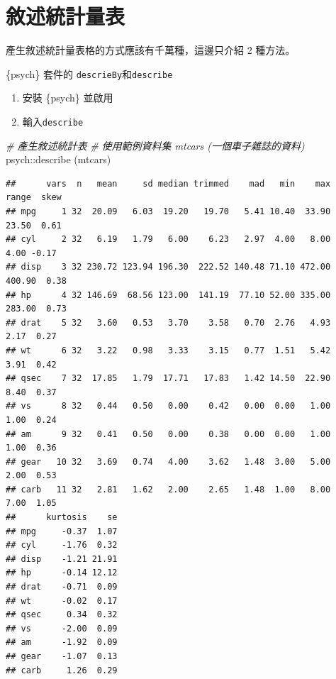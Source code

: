 \documentclass[
]{book}
\newenvironment{Shaded}{\begin{snugshade}}{\end{snugshade}}
\newcommand{\CommentTok}[1]{\textcolor[rgb]{0.56,0.35,0.01}{\textit{#1}}}
\newcommand{\FunctionTok}[1]{\textcolor[rgb]{0.00,0.00,0.00}{#1}}
\newcommand{\NormalTok}[1]{#1}
\newcommand{\SpecialCharTok}[1]{\textcolor[rgb]{0.00,0.00,0.00}{#1}}
\begin{document}
\hypertarget{ux6558ux8ff0ux7d71ux8a08ux91cfux8868}{%
\section{敘述統計量表}\label{ux6558ux8ff0ux7d71ux8a08ux91cfux8868}}

產生敘述統計量表格的方式應該有千萬種，這邊只介紹 2 種方法。

\{psych\} 套件的 \texttt{descrieBy}和\texttt{describe}

\begin{enumerate}
\def\labelenumi{\arabic{enumi}.}
\item
  安裝 \{psych\} 並啟用
\item
  輸入\texttt{describe}
\end{enumerate}

\begin{Shaded}
\begin{Highlighting}[]
\CommentTok{\# 產生敘述統計表}
\CommentTok{\# 使用範例資料集 mtcars (一個車子雜誌的資料)}
\NormalTok{psych}\SpecialCharTok{::}\FunctionTok{describe}\NormalTok{ (mtcars)}
\end{Highlighting}
\end{Shaded}

\begin{verbatim}
##      vars  n   mean     sd median trimmed    mad   min    max  range  skew
## mpg     1 32  20.09   6.03  19.20   19.70   5.41 10.40  33.90  23.50  0.61
## cyl     2 32   6.19   1.79   6.00    6.23   2.97  4.00   8.00   4.00 -0.17
## disp    3 32 230.72 123.94 196.30  222.52 140.48 71.10 472.00 400.90  0.38
## hp      4 32 146.69  68.56 123.00  141.19  77.10 52.00 335.00 283.00  0.73
## drat    5 32   3.60   0.53   3.70    3.58   0.70  2.76   4.93   2.17  0.27
## wt      6 32   3.22   0.98   3.33    3.15   0.77  1.51   5.42   3.91  0.42
## qsec    7 32  17.85   1.79  17.71   17.83   1.42 14.50  22.90   8.40  0.37
## vs      8 32   0.44   0.50   0.00    0.42   0.00  0.00   1.00   1.00  0.24
## am      9 32   0.41   0.50   0.00    0.38   0.00  0.00   1.00   1.00  0.36
## gear   10 32   3.69   0.74   4.00    3.62   1.48  3.00   5.00   2.00  0.53
## carb   11 32   2.81   1.62   2.00    2.65   1.48  1.00   8.00   7.00  1.05
##      kurtosis    se
## mpg     -0.37  1.07
## cyl     -1.76  0.32
## disp    -1.21 21.91
## hp      -0.14 12.12
## drat    -0.71  0.09
## wt      -0.02  0.17
## qsec     0.34  0.32
## vs      -2.00  0.09
## am      -1.92  0.09
## gear    -1.07  0.13
## carb     1.26  0.29
\end{verbatim}
\end{document}
